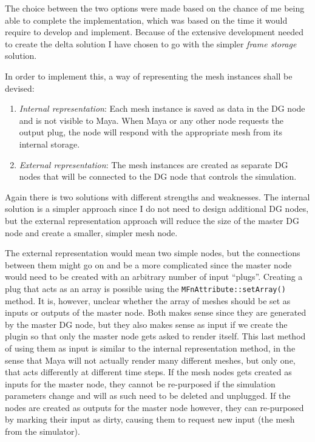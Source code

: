 The choice between the two options were made based on the chance of me being
able to complete the implementation, which was based on the time it would
require to develop and implement. Because of the extensive development needed to
create the delta solution I have chosen to go with the simpler \textit{frame
storage} solution.

In order to implement this, a way of representing the mesh instances shall be
devised:

\begin{enumerate}
  \item \textit{Internal representation}: Each mesh instance is saved as data in
    the DG node and is not visible to Maya. When Maya or any other node requests
    the output plug, the node will respond with the appropriate mesh from its
    internal storage.
  \item \textit{External representation}: The mesh instances are created as
    separate DG nodes that will be connected to the DG node that controls the
    simulation.
\end{enumerate}

Again there is two solutions with different strengths and weaknesses. The
internal solution is a simpler approach since I do not need to design additional
DG nodes, but the external representation approach will reduce the size of the
master DG node and create a smaller, simpler mesh node.

The external representation would mean two simple nodes, but the connections
between them might go on and be a more complicated since the master node would
need to be created with an arbitrary number of input ``plugs''. Creating a plug
that acts as an array is possible using the \texttt{MFnAttribute::setArray()}
method. It is, however, unclear whether the array of
meshes should be set as inputs or outputs of the master node. Both makes sense
since they are generated by the master DG node, but they also makes sense
as input if we create the plugin so that only the master node gets asked to
render itself. This last method of using them as input is similar to the
internal representation method, in the sense that Maya will not actually render
many different meshes, but only one, that acts differently at different
time steps. If the mesh nodes gets created as inputs for the master node, they
cannot be re-purposed if the simulation parameters change and will as such need
to be deleted and unplugged. If the nodes are created as outputs for the master
node however, they can re-purposed by marking their input as dirty, causing them
to request new input (the mesh from the simulator).

